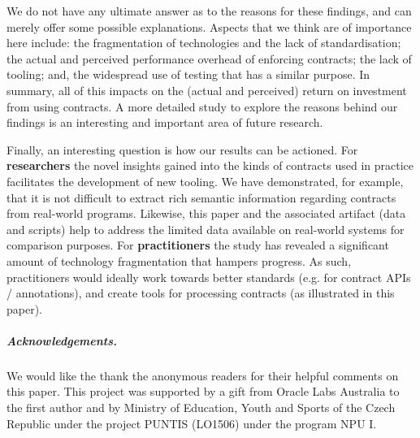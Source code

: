 \documentclass[a4paper,UKenglish]{lipics-v2016}
\begin{document}
We do not have any ultimate answer as to the reasons for these findings, and can merely offer some possible explanations. Aspects that we think are of importance here include: the fragmentation of technologies and the lack of standardisation; the actual and perceived performance overhead of enforcing contracts; the lack of tooling; and, the widespread use of testing that has a similar purpose. In summary, all of this impacts on the (actual and perceived) return on investment from using contracts.
A more detailed study to explore the reasons behind our findings is an interesting and important area of future research. 

Finally, an interesting question is how our results can be actioned.  For {\bf researchers} the novel insights gained into the kinds of contracts used in practice facilitates the development of new tooling.  We have demonstrated, for example, that it is not difficult to extract rich semantic information regarding contracts from real-world programs.  Likewise, this paper and the associated artifact (data and scripts) help to address the limited data available on real-world systems for comparison purposes.  For {\bf practitioners} the study has revealed a significant amount of technology fragmentation that hampers progress.  As such, practitioners would ideally work towards better standards (e.g. for contract APIs / annotations), and create tools for processing contracts (as illustrated in this paper).

\subparagraph*{Acknowledgements.}

We would like the thank the anonymous readers for their helpful comments on this paper.
This project was supported by a gift from Oracle Labs Australia to the first author and by Ministry of Education, Youth and Sports of the Czech Republic under the project PUNTIS (LO1506) under the program NPU I. 



	


\end{document}

